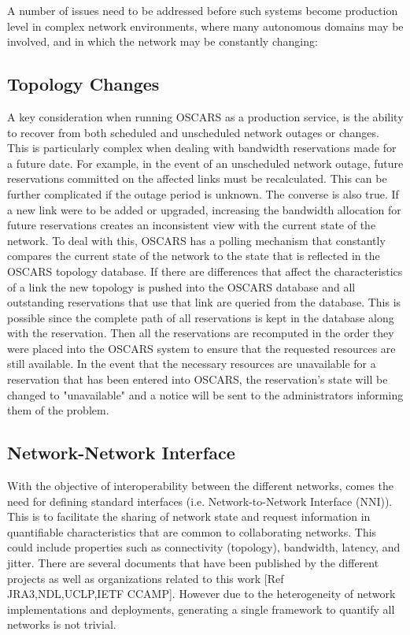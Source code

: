 \documentclass[conference]{IEEEtran}
\begin{document}
A number of issues need to be addressed before such systems become
production level in complex network environments, where many autonomous
domains may be involved, and in which the network may be constantly
changing:

\subsection{Topology Changes}

A key consideration when running OSCARS as a production service, is the ability
to recover from both scheduled and unscheduled network outages or changes.  This
is particularly complex when dealing with bandwidth reservations made for a
future date.  For example, in the event of an unscheduled network outage, future
reservations committed on the affected links must be recalculated. This can be
further complicated if the outage period is unknown.  The converse is also true.
If a new link were to be added or upgraded, increasing the bandwidth allocation
for future reservations creates an inconsistent view with the current state of
the network.  To deal with this, OSCARS
has a polling mechanism that constantly
compares the current state of the network to the state that is reflected in the
OSCARS topology database. If there are differences that affect the
characteristics of a link the new topology is pushed into the OSCARS database
and all outstanding reservations that use that link are queried from the
database. This is possible since the complete path of all reservations is kept
in the database along with the reservation. Then all the reservations are
recomputed in the order they were placed into the OSCARS system to ensure that
the requested resources are still available.  In the event that the necessary
resources are unavailable for a reservation that has been entered into OSCARS,
the reservation's state will be changed to "unavailable" and a notice will be
sent to the administrators informing them of the problem.

\subsection{Network-Network Interface}
With the objective of interoperability between the different networks,
comes the need for defining standard interfaces (i.e. Network-to-Network
Interface (NNI)).  This is to facilitate the sharing of network state and
request information in quantifiable characteristics that are common to
collaborating networks.  This could include properties such as connectivity
(topology), bandwidth, latency, and jitter.  There are several documents
that have been published by the different projects as well as organizations
related to this work [Ref JRA3,NDL,UCLP,IETF CCAMP]. However due to the
heterogeneity of network implementations and deployments, generating a single
framework to quantify all networks is not trivial.
\end{document}
